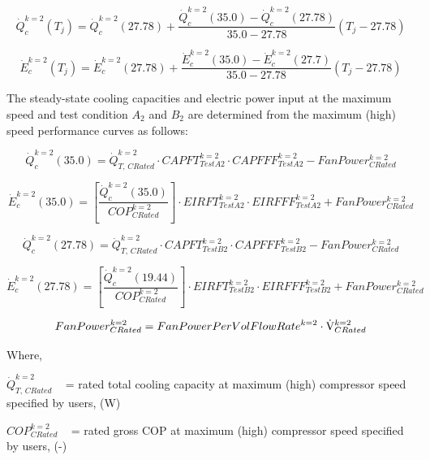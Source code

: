 \begin{equation}
\dot Q_c^{k = 2}({T_j}) = \dot Q_c^{k = 2}(27.78) + \frac{{\dot Q_c^{k = 2}(35.0) - \dot Q_c^{k = 2}(27.78)}}{{35.0 - 27.78}}\left( {{T_j} - 27.78} \right)
\end{equation}

\begin{equation}
\dot E_c^{k = 2}({T_j}) = \dot E_c^{k = 2}(27.78) + \frac{{\dot E_c^{k = 2}(35.0) - \dot E_c^{k = 2}(27.7)}}{{35.0 - 27.78}}\left( {{T_j} - 27.78} \right)
\end{equation}

The steady-state cooling capacities and electric power input at the maximum speed and test condition \(A_{2}\) and \(B_{2}\) are determined from the maximum (high) speed performance curves as follows:

\begin{equation}
\dot Q_c^{k = 2}(35.0) = \dot Q_{T,\,CRated}^{k = 2} \cdot CAPFT_{TestA2}^{k = 2} \cdot CAPFFF_{TestA2}^{k = 2} - FanPower_{CRated}^{k = 2}
\end{equation}

\begin{equation}
\dot E_c^{k = 2}(35.0) = \left[ {\frac{{\dot Q_c^{k = 2}(35.0)}}{{COP_{CRated}^{k = 2}}}} \right] \cdot EIRFT_{TestA2}^{k = 2} \cdot EIRFFF_{TestA2}^{k = 2} + FanPower_{CRated}^{k = 2}
\end{equation}

\begin{equation}
  \dot Q_c^{k = 2}(27.78) = \dot Q_{T,\,CRated}^{k = 2} \cdot CAPFT_{TestB2}^{k = 2} \cdot CAPFFF_{TestB2}^{k = 2} - FanPower_{CRated}^{k = 2}
\end{equation}

\begin{equation}
  \dot E_c^{k = 2}(27.78) = \left[ {\frac{{\dot Q_c^{k = 2}(19.44)}}{{COP_{CRated}^{k = 2}}}} \right] \cdot EIRFT_{TestB2}^{k = 2} \cdot EIRFFF_{TestB2}^{k = 2} + FanPower_{CRated}^{k = 2}
\end{equation}

\begin{equation}
  FanPower_{CRated}^{k = 2} = FanPowerPerVolFlowRat{e^{k = 2}} \cdot {\rm{\dot V}}_{CRated}^{k = 2}
\end{equation}

Where,

\(\dot Q_{T,\,CRated}^{k = 2}\) ~ = rated total cooling capacity at maximum (high) compressor speed specified by users, (W)

\(COP_{CRated}^{k = 2}\) ~ = rated gross COP at maximum (high) compressor speed specified by users, (-)

